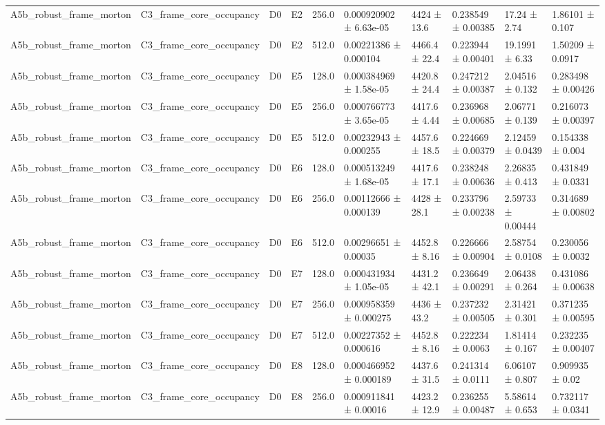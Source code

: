 \begin{table}
\begin{tabular}{llllllllll}
A5b\_robust\_frame\_morton & C3\_frame\_core\_occupancy & D0 & E2 & 256.0 & 0.000920902 ± 6.63e-05 & 4424 ± 13.6 & 0.238549 ± 0.00385 & 17.24 ± 2.74 & 1.86101 ± 0.107 \\
A5b\_robust\_frame\_morton & C3\_frame\_core\_occupancy & D0 & E2 & 512.0 & 0.00221386 ± 0.000104 & 4466.4 ± 22.4 & 0.223944 ± 0.00401 & 19.1991 ± 6.33 & 1.50209 ± 0.0917 \\
A5b\_robust\_frame\_morton & C3\_frame\_core\_occupancy & D0 & E5 & 128.0 & 0.000384969 ± 1.58e-05 & 4420.8 ± 24.4 & 0.247212 ± 0.00387 & 2.04516 ± 0.132 & 0.283498 ± 0.00426 \\
A5b\_robust\_frame\_morton & C3\_frame\_core\_occupancy & D0 & E5 & 256.0 & 0.000766773 ± 3.65e-05 & 4417.6 ± 4.44 & 0.236968 ± 0.00685 & 2.06771 ± 0.139 & 0.216073 ± 0.00397 \\
A5b\_robust\_frame\_morton & C3\_frame\_core\_occupancy & D0 & E5 & 512.0 & 0.00232943 ± 0.000255 & 4457.6 ± 18.5 & 0.224669 ± 0.00379 & 2.12459 ± 0.0439 & 0.154338 ± 0.004 \\
A5b\_robust\_frame\_morton & C3\_frame\_core\_occupancy & D0 & E6 & 128.0 & 0.000513249 ± 1.68e-05 & 4417.6 ± 17.1 & 0.238248 ± 0.00636 & 2.26835 ± 0.413 & 0.431849 ± 0.0331 \\
A5b\_robust\_frame\_morton & C3\_frame\_core\_occupancy & D0 & E6 & 256.0 & 0.00112666 ± 0.000139 & 4428 ± 28.1 & 0.233796 ± 0.00238 & 2.59733 ± 0.00444 & 0.314689 ± 0.00802 \\
A5b\_robust\_frame\_morton & C3\_frame\_core\_occupancy & D0 & E6 & 512.0 & 0.00296651 ± 0.00035 & 4452.8 ± 8.16 & 0.226666 ± 0.00904 & 2.58754 ± 0.0108 & 0.230056 ± 0.0032 \\
A5b\_robust\_frame\_morton & C3\_frame\_core\_occupancy & D0 & E7 & 128.0 & 0.000431934 ± 1.05e-05 & 4431.2 ± 42.1 & 0.236649 ± 0.00291 & 2.06438 ± 0.264 & 0.431086 ± 0.00638 \\
A5b\_robust\_frame\_morton & C3\_frame\_core\_occupancy & D0 & E7 & 256.0 & 0.000958359 ± 0.000275 & 4436 ± 43.2 & 0.237232 ± 0.00505 & 2.31421 ± 0.301 & 0.371235 ± 0.00595 \\
A5b\_robust\_frame\_morton & C3\_frame\_core\_occupancy & D0 & E7 & 512.0 & 0.00227352 ± 0.000616 & 4452.8 ± 8.16 & 0.222234 ± 0.0063 & 1.81414 ± 0.167 & 0.232235 ± 0.00407 \\
A5b\_robust\_frame\_morton & C3\_frame\_core\_occupancy & D0 & E8 & 128.0 & 0.000466952 ± 0.000189 & 4437.6 ± 31.5 & 0.241314 ± 0.0111 & 6.06107 ± 0.807 & 0.909935 ± 0.02 \\
A5b\_robust\_frame\_morton & C3\_frame\_core\_occupancy & D0 & E8 & 256.0 & 0.000911841 ± 0.00016 & 4423.2 ± 12.9 & 0.236255 ± 0.00487 & 5.58614 ± 0.653 & 0.732117 ± 0.0341 \\

\end{tabular}
\end{table}
